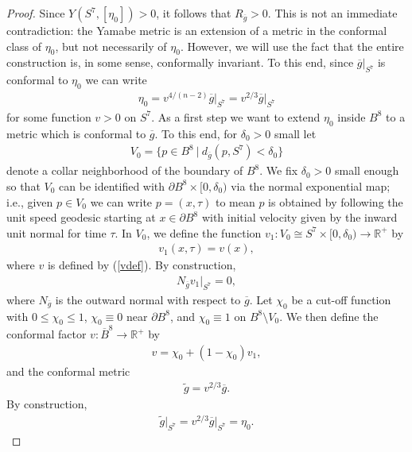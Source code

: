\documentclass{amsart}
\theoremstyle{definition}
\theoremstyle{remark}
\numberwithin{equation}{section}
\begin{document}
\begin{proof}
Since $Y(S^7,[\eta_0]) > 0$, it follows that $R_{\overline{g}} > 0$.  This is not an immediate contradiction: the Yamabe metric is an extension of a metric in the conformal class of $\eta_0$, but not necessarily of $\eta_0$.  However, we will use the fact that the entire construction is, in some sense, conformally invariant.  To this end, since $\overline{g}|_{S^7}$ is conformal to $\eta_0$ we can write
\begin{align} \label{vdef}
\eta_0 = v^{4/(n-2)}\overline{g} \big|_{S^7} = v^{2/3}\overline{g} \big|_{S^7}
\end{align}
for some function $v > 0$ on $S^7$.  As a first step we want to extend $\eta_0$ inside $B^8$ to a metric which is conformal to $\overline{g}$.  To this end, for $\delta_0 > 0$ small let
\begin{align*} %
V_0 = \{ p \in B^8 \ |\ d_{\overline{g}}(p,S^7) < \delta_0  \}
\end{align*}
denote a collar neighborhood of the boundary of $B^8$.  We fix $\delta_0 > 0$ small enough so that $V_{0}$ can be identified with $\partial B^8 \times [0,\delta_0)$ via the normal exponential map; i.e., given $p \in V_0$ we can write $p = (x,\tau)$ to mean $p$ is obtained by following the unit speed geodesic starting at $x \in \partial B^8$ with initial velocity given by the inward unit normal for time $\tau$.  In $V_{0}$, we define the function $v_1 : V_0 \cong S^7 \times [0,\delta_0) \rightarrow \mathbb{R}^{+}$ by
\begin{align*} %
v_1(x,\tau) = v(x),
\end{align*}
where $v$ is defined by (\ref{vdef}).  By construction,
\begin{align} \label{Nbv}
N_{\overline{g}}v_1 \big|_{S^7} = 0,
\end{align}
where $N_{\overline{g}}$ is the outward normal with respect to $\overline{g}$.  Let $\chi_0$ be a cut-off function with $0 \leq \chi_0 \leq 1$, $\chi_0 \equiv 0$ near $\partial B^8$, and $\chi_0 \equiv 1$ on $B^8 \setminus V_0$.
We then define the conformal factor $v : \overline{B}^8 \rightarrow \mathbb{R}^{+}$ by
\begin{align*} %
v = \chi_0 + ( 1 - \chi_0) v_1,
\end{align*}
and the conformal metric
\begin{align*} %
\widetilde{g} = v^{2/3} \overline{g}.
\end{align*}
By construction,
\begin{align*}
\widetilde{g} \big|_{S^7} = v^{2/3}\overline{g}\big|_{S^7} = \eta_0.
\end{align*}



\end{proof}
\end{document}
